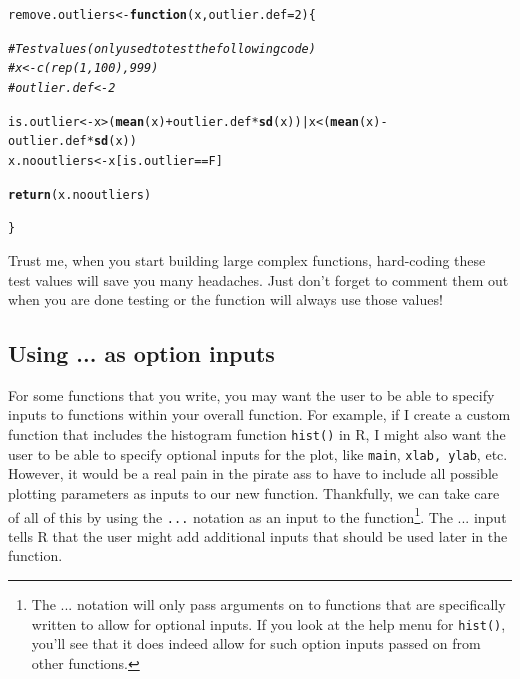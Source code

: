 \documentclass{tufte-book}\usepackage[]{graphicx}\usepackage[]{color}
\makeatletter
\newcommand{\hlnum}[1]{\textcolor[rgb]{0.686,0.059,0.569}{#1}}%
\newcommand{\hlcom}[1]{\textcolor[rgb]{0.678,0.584,0.686}{\textit{#1}}}%
\newcommand{\hlopt}[1]{\textcolor[rgb]{0,0,0}{#1}}%
\newcommand{\hlstd}[1]{\textcolor[rgb]{0.345,0.345,0.345}{#1}}%
\newcommand{\hlkwa}[1]{\textcolor[rgb]{0.161,0.373,0.58}{\textbf{#1}}}%
\newcommand{\hlkwb}[1]{\textcolor[rgb]{0.69,0.353,0.396}{#1}}%
\newcommand{\hlkwc}[1]{\textcolor[rgb]{0.333,0.667,0.333}{#1}}%
\newcommand{\hlkwd}[1]{\textcolor[rgb]{0.737,0.353,0.396}{\textbf{#1}}}%
\newenvironment{kframe}{%
 \def\at@end@of@kframe{}%
 \ifinner\ifhmode%
  \def\at@end@of@kframe{\end{minipage}}%
  \begin{minipage}{\columnwidth}%
 \fi\fi%
 \def\FrameCommand##1{\hskip\@totalleftmargin \hskip-\fboxsep
 \colorbox{shadecolor}{##1}\hskip-\fboxsep
     \hskip-\linewidth \hskip-\@totalleftmargin \hskip\columnwidth}%
 \MakeFramed {\advance\hsize-\width
   \@totalleftmargin\z@ \linewidth\hsize
   \@setminipage}}%
 {\par\unskip\endMakeFramed%
 \at@end@of@kframe}
\newenvironment{knitrout}{}{} %
\makeatother
\begin{document}
\begin{knitrout}
\color{fgcolor}\begin{kframe}
\begin{alltt}
\hlstd{remove.outliers} \hlkwb{<-} \hlkwa{function}\hlstd{(}\hlkwc{x}\hlstd{,} \hlkwc{outlier.def} \hlstd{=} \hlnum{2}\hlstd{) \{}

\hlcom{# Test values (only used to test the following code)}
\hlcom{#  x <- c(rep(1, 100), 999)}
\hlcom{#  outlier.def <- 2}

  \hlstd{is.outlier} \hlkwb{<-} \hlstd{x} \hlopt{>} \hlstd{(}\hlkwd{mean}\hlstd{(x)} \hlopt{+} \hlstd{outlier.def} \hlopt{*} \hlkwd{sd}\hlstd{(x))} \hlopt{|} \hlstd{x} \hlopt{<} \hlstd{(}\hlkwd{mean}\hlstd{(x)} \hlopt{-} \hlstd{outlier.def} \hlopt{*} \hlkwd{sd}\hlstd{(x))}
  \hlstd{x.nooutliers} \hlkwb{<-} \hlstd{x[is.outlier} \hlopt{==} \hlstd{F]}

  \hlkwd{return}\hlstd{(x.nooutliers)}

\hlstd{\}}
\end{alltt}
\end{kframe}
\end{knitrout}

Trust me, when you start building large complex functions, hard-coding these test values will save you many headaches. Just don't forget to comment them out when you are done testing or the function will always use those values!


\subsection{Using ... as option inputs}

For some functions that you write, you may want the user to be able to specify inputs to functions within your overall function. For example, if I create a custom function that includes the histogram function \texttt{hist()} in R, I might also want the user to be able to specify optional inputs for the plot, like \texttt{main}, \texttt{xlab, ylab}, etc. However, it would be a real pain in the pirate ass to have to include all possible plotting parameters as inputs to our new function. Thankfully, we can take care of all of this by using the \texttt{...} notation as an input to the function\footnote{The ... notation will only pass arguments on to functions that are specifically written to allow for optional inputs. If you look at the help menu for \texttt{hist()}, you'll see that it does indeed allow for such option inputs passed on from other functions.}. The ... input tells R that the user might add additional inputs that should be used later in the function.
\end{document}

